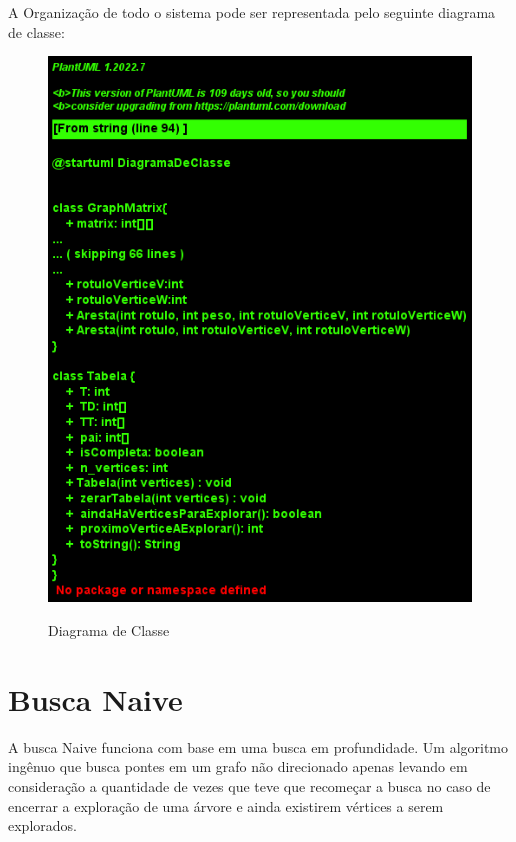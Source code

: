 A Organização de todo o sistema pode ser representada pelo seguinte diagrama de classe:

\begin{figure}[H]
	\setlength{\abovecaptionskip}{0pt}
	\setlength{\belowcaptionskip}{0pt}
	\caption[Diagrama de Classe]{Diagrama de Classe}
	\centering
	\includegraphics[width=1\textwidth]{DiagramaDeClasse/DiagramaDeClasse.png}
	\captionsetup{justification=centering}
	\label{fig:DiagramaDeClasse}
\end{figure}

\section{Busca Naive}

A busca Naive funciona com base em uma busca em profundidade. Um algoritmo ingênuo que busca pontes em um grafo não direcionado apenas levando em 
consideração a quantidade de vezes que teve que recomeçar a busca no caso de encerrar a exploração de uma árvore e ainda existirem vértices a serem 
explorados.

